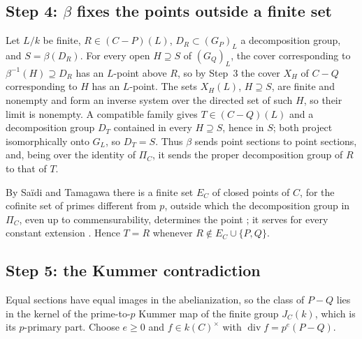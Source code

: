 \documentclass[11pt]{amsart}
\theoremstyle{remark}
\DeclareMathOperator{\divi}{div}
\begin{document}
\subsection{Step 4: $\beta$ fixes the points outside a finite set}
Let $L/k$ be finite, $R\in(C-P)(L)$, $D_R\subset (G_P)_L$ a decomposition group, and $S=\beta(D_R)$. For every open $H\supseteq S$ of $(G_Q)_L$, the cover corresponding to $\beta^{-1}(H)\supseteq D_R$ has an $L$-point above $R$, so by Step~3 the cover $X_H$ of $C-Q$ corresponding to $H$ has an $L$-point. The sets $X_H(L)$, $H\supseteq S$, are finite and nonempty and form an inverse system over the directed set of such $H$, so their limit is nonempty. A compatible family gives $T\in(C-Q)(L)$ and a decomposition group $D_T$ contained in every $H\supseteq S$, hence in $S$; both project isomorphically onto $G_L$, so $D_T=S$. Thus $\beta$ sends point sections to point sections, and, being over the identity of $\Pi_C$, it sends the proper decomposition group of $R$ to that of $T$.

By Sa\"idi and Tamagawa there is a finite set $E_C$ of closed points of $C$, for the cofinite set of primes different from $p$, outside which the decomposition group in $\Pi_C$, even up to commensurability, determines the point \cite[Definitions 1.3, 1.5, 1.10, Proposition 1.8(vi)]{ST09}; it serves for every constant extension \cite[Remark 1.2]{ST09}. Hence $T=R$ whenever $R\notin E_C\cup\{P,Q\}$.

\subsection{Step 5: the Kummer contradiction}
Equal sections have equal images in the abelianization, so the class of $P-Q$ lies in the kernel of the prime-to-$p$ Kummer map of the finite group $J_C(k)$, which is its $p$-primary part. Choose $e\ge0$ and $f\in k(C)^\times$ with $\divi f=p^e(P-Q)$.
\end{document}
